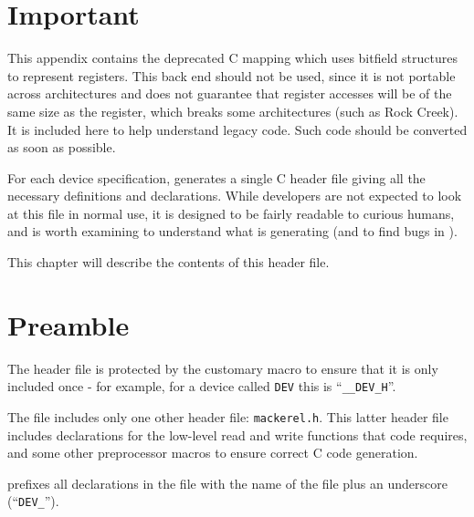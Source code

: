\documentclass[a4paper,11pt,twoside]{report}
\begin{document}
\section*{Important}
This appendix contains the deprecated C mapping which uses bitfield
structures to represent registers.  This back end should not be used,
since it is not portable across architectures and does not guarantee
that register accesses will be of the same size as the register, which
breaks some architectures (such as Rock Creek).   It is included here
to help understand legacy code.  Such code should be converted as soon
as possible. 

For each device specification, \Mac generates a single C header file
giving all the necessary definitions and declarations.   While
developers are not expected to look at this file in normal use, it is
designed to be fairly readable to curious humans, and is worth
examining to understand what \Mac is generating (and to find bugs in
\Mac). 

This chapter will describe the contents of this header file. 

\section{Preamble}

The header file is protected by the customary macro to ensure that it
is only included once - for example, for a device called \texttt{DEV} this is
``\texttt{\_\_DEV\_H}''. 

The file includes only one other header file: \texttt{mackerel.h}.
This latter header file includes declarations for the low-level read
and write functions that \Mac code requires, and some other
preprocessor macros to ensure correct C code generation.   

\Mac prefixes all declarations in the file with the
name of the file plus an underscore (``\texttt{DEV\_}''). 





\end{document}
